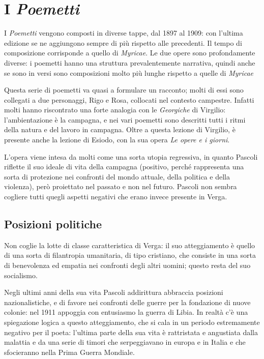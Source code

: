 \chapter{I \textit{Poemetti}}


I \textit{Poemetti} vengono composti in diverse tappe, dal 1897 al 1909: con l'ultima edizione se ne aggiungono sempre di più rispetto alle precedenti.
Il tempo di composizione corrisponde a quello di \textit{Myricae}.
Le due opere sono profondamente diverse: i poemetti hanno una struttura prevalentemente narrativa, quindi anche se sono in versi sono composizioni molto più lunghe rispetto a quelle di \textit{Myricae}

Questa serie di poemetti va quasi a formulare un racconto; molti di essi sono collegati a due personaggi, Rigo e Rosa, collocati nel contesto campestre.
Infatti molti hanno riscontrato una forte analogia con le \textit{Georgiche} di Virgilio: l'ambientazione è la campagna, e nei vari poemetti sono descritti tutti i ritmi della natura e del lavoro in campagna. Oltre a questa lezione di Virgilio, è presente anche la lezione di Esiodo, con la sua opera \textit{Le opere e i giorni}.

L'opera viene intesa da molti come una sorta utopia regressiva, in quanto Pascoli riflette il suo ideale di vita della campagna (positivo, perché rappresenta una sorta di protezione nei confronti del mondo attuale, della politica e della violenza), però proiettato nel passato e non nel futuro. Pascoli non sembra cogliere tutti quegli aspetti negativi che erano invece presente in Verga.

\section{Posizioni politiche}

Non coglie la lotte di classe caratteristica di Verga: il suo atteggiamento è quello di una sorta di filantropia umanitaria, di tipo cristiano, che consiste in una sorta di benevolenza ed empatia nei confronti degli altri uomini; questo resta del suo socialismo.

Negli ultimi anni della sua vita Pascoli addirittura abbraccia posizioni nazionalistiche, e di favore nei confronti delle guerre per la fondazione di nuove colonie: nel 1911 appoggia con entusiasmo la guerra di Libia. In realtà c'è una spiegazione logica a questo atteggiamento, che si cala in un periodo estremamente negativo per il poeta: l'ultima parte della sua vita è rattristata e angustiata dalla malattia e da una serie di timori che serpeggiavano in europa e in Italia e che sfocieranno nella Prima Guerra Mondiale.

